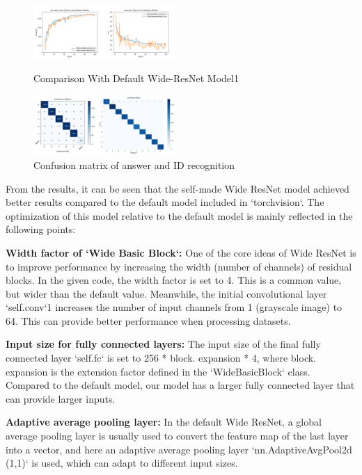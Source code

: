 \documentclass[twocolumn]{article}
\begin{document}
        
        \begin{figure}[ht]
            \centering
            \includegraphics[width=0.48\textwidth]{Comparison With Default Wide-ResNet Model1.png}
            \caption{Comparison With Default Wide-ResNet Model1}
            \label{fig:Comparison With Default Wide-ResNet Model1}

            \includegraphics[width=0.48\textwidth]{conf_matrix1.png}
            \caption{Confusion matrix of answer and ID recognition} 
            \label{fig:conf_matrix1}

        \end{figure}

        From the results, it can be seen that the self-made Wide ResNet model achieved better results compared to the default model included in `torchvision`. The optimization of this model relative to the default model is mainly reflected in the following points:

        \textbf{Width factor of `Wide Basic Block`:}
        One of the core ideas of Wide ResNet is to improve performance by increasing the width (number of channels) of residual blocks. In the given code, the width factor is set to 4. This is a common value, but wider than the default value. Meanwhile, the initial convolutional layer `self.conv`1 increases the number of input channels from 1 (grayscale image) to 64. This can provide better performance when processing datasets.

        \textbf{Input size for fully connected layers:}
        The input size of the final fully connected layer `self.fc` is set to 256 * block. expansion * 4, where block. expansion is the extension factor defined in the `WideBasicBlock` class. Compared to the default model, our model has a larger fully connected layer that can provide larger inputs.

        \textbf{Adaptive average pooling layer:}
        In the default Wide ResNet, a global average pooling layer is usually used to convert the feature map of the last layer into a vector, and here an adaptive average pooling layer `nn.AdaptiveAvgPool2d (1,1)` is used, which can adapt to different input sizes.
\end{document}
